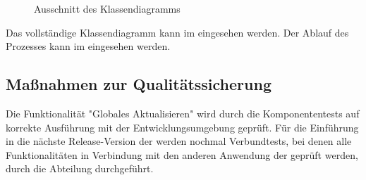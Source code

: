 \begin{figure}[htb]
	\centering
	\caption{Ausschnitt des Klassendiagramms}
\end{figure}

Das vollständige Klassendiagramm kann im  eingesehen werden.
Der Ablauf des Prozesses kann im  eingesehen werden.

\subsection{Maßnahmen zur Qualitätssicherung}
\label{sec:Qualitaetssicherung}

Die Funktionalität "Globales Aktualisieren" wird durch die Komponententests auf korrekte Ausführung mit der Entwicklungsumgebung geprüft. Für die Einführung in die nächste Release-Version der \CBPAD werden nochmal Verbundtests, bei denen alle Funktionalitäten in Verbindung mit den anderen Anwendung der \CBP\xspace geprüft werden, durch die Abteilung durchgeführt.


